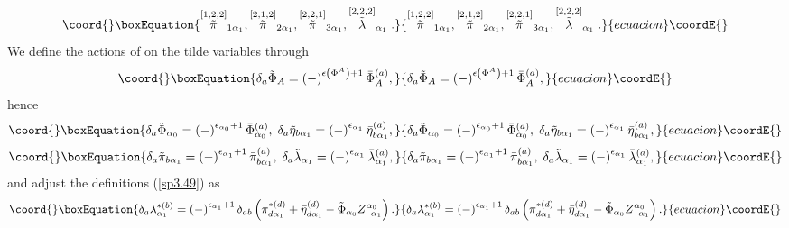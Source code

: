 \documentclass[a4paper,12pt]{article}
\begin{document}
\begin{equation}\coord{}\boxEquation{
\stackrel{\left[ 1,2,2\right] }{\tilde{\pi}}_{1\alpha _{1}},\stackrel{\left[
2,1,2\right] }{\tilde{\pi}}_{2\alpha _{1}},\stackrel{\left[ 2,2,1\right] }{
\tilde{\pi}}_{3\alpha _{1}},\stackrel{\left[ 2,2,2\right] }{\tilde{\lambda}}
_{\alpha _{1}}.  \label{sp3.54}
}{
\stackrel{\left[ 1,2,2\right] }{\tilde{\pi}}_{1\alpha _{1}},\stackrel{\left[
2,1,2\right] }{\tilde{\pi}}_{2\alpha _{1}},\stackrel{\left[ 2,2,1\right] }{
\tilde{\pi}}_{3\alpha _{1}},\stackrel{\left[ 2,2,2\right] }{\tilde{\lambda}}
_{\alpha _{1}}.  }{ecuacion}\coordE{}\end{equation}
We define the actions of \coordHE{} on the tilde variables through 
\begin{equation}\coord{}\boxEquation{
\delta _{a}\tilde{\Phi}_{A}=\left( -\right) ^{\epsilon \left( \Phi
^{A}\right) +1}\bar{\Phi}_{A}^{(a)},  \label{sp3.55}
}{
\delta _{a}\tilde{\Phi}_{A}=\left( -\right) ^{\epsilon \left( \Phi
^{A}\right) +1}\bar{\Phi}_{A}^{(a)},  }{ecuacion}\coordE{}\end{equation}
hence 
\begin{equation}\coord{}\boxEquation{
\delta _{a}\tilde{\Phi}_{\alpha _{0}}=\left( -\right) ^{\epsilon _{\alpha
_{0}}+1}\bar{\Phi}_{\alpha _{0}}^{(a)},\;\delta _{a}\tilde{\eta}_{b\alpha
_{1}}=\left( -\right) ^{\epsilon _{\alpha _{1}}}\bar{\eta}_{b\alpha
_{1}}^{(a)},  \label{sp3.56}
}{
\delta _{a}\tilde{\Phi}_{\alpha _{0}}=\left( -\right) ^{\epsilon _{\alpha
_{0}}+1}\bar{\Phi}_{\alpha _{0}}^{(a)},\;\delta _{a}\tilde{\eta}_{b\alpha
_{1}}=\left( -\right) ^{\epsilon _{\alpha _{1}}}\bar{\eta}_{b\alpha
_{1}}^{(a)},  }{ecuacion}\coordE{}\end{equation}
\begin{equation}\coord{}\boxEquation{
\delta _{a}\tilde{\pi}_{b\alpha _{1}}=\left( -\right) ^{\epsilon _{\alpha
_{1}}+1}\bar{\pi}_{b\alpha _{1}}^{(a)},\;\delta _{a}\tilde{\lambda}_{\alpha
_{1}}=\left( -\right) ^{\epsilon _{\alpha _{1}}}\bar{\lambda}_{\alpha
_{1}}^{(a)},  \label{sp3.57}
}{
\delta _{a}\tilde{\pi}_{b\alpha _{1}}=\left( -\right) ^{\epsilon _{\alpha
_{1}}+1}\bar{\pi}_{b\alpha _{1}}^{(a)},\;\delta _{a}\tilde{\lambda}_{\alpha
_{1}}=\left( -\right) ^{\epsilon _{\alpha _{1}}}\bar{\lambda}_{\alpha
_{1}}^{(a)},  }{ecuacion}\coordE{}\end{equation}
and adjust the definitions (\ref{sp3.49}) as 
\begin{equation}\coord{}\boxEquation{
\delta _{a}\lambda _{\alpha _{1}}^{*(b)}=\left( -\right) ^{\epsilon _{\alpha
_{1}}+1}\delta _{ab}\left( \pi _{d\alpha _{1}}^{*(d)}+\bar{\eta}_{d\alpha
_{1}}^{(d)}-\tilde{\Phi}_{\alpha _{0}}Z_{\;\;\alpha _{1}}^{\alpha
_{0}}\right) .  \label{sp3.58}
}{
\delta _{a}\lambda _{\alpha _{1}}^{*(b)}=\left( -\right) ^{\epsilon _{\alpha
_{1}}+1}\delta _{ab}\left( \pi _{d\alpha _{1}}^{*(d)}+\bar{\eta}_{d\alpha
_{1}}^{(d)}-\tilde{\Phi}_{\alpha _{0}}Z_{\;\;\alpha _{1}}^{\alpha
_{0}}\right) .  }{ecuacion}\coordE{}\end{equation}
\end{document}
